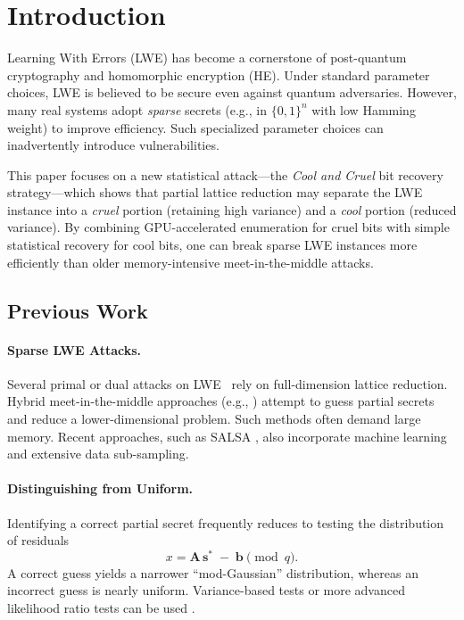 \documentclass[11pt]{article}
\begin{document}
\section{Introduction}
\label{sec:intro}
Learning With Errors (LWE) has become a cornerstone of post-quantum cryptography and homomorphic encryption (HE). Under standard parameter choices, LWE is believed to be secure even against quantum adversaries. However, many real systems adopt \emph{sparse} secrets (e.g., in $\{0,1\}^n$ with low Hamming weight) to improve efficiency. Such specialized parameter choices can inadvertently introduce vulnerabilities.

This paper focuses on a new statistical attack---the \emph{Cool and Cruel} bit recovery strategy---which shows that partial lattice reduction may separate the LWE instance into a \emph{cruel} portion (retaining high variance) and a \emph{cool} portion (reduced variance). By combining GPU-accelerated enumeration for cruel bits with simple statistical recovery for cool bits, one can break sparse LWE instances more efficiently than older memory-intensive meet-in-the-middle attacks.

\subsection{Previous Work}
\label{sec:previous}
\paragraph{Sparse LWE Attacks.}
Several primal or dual attacks on LWE~\cite{regev,bkz2,flatter} rely on full-dimension lattice reduction. Hybrid meet-in-the-middle approaches (e.g., \cite{ref_mitm}) attempt to guess partial secrets and reduce a lower-dimensional problem. Such methods often demand large memory. Recent approaches, such as SALSA \cite{salsa}, also incorporate machine learning and extensive data sub-sampling.

\paragraph{Distinguishing from Uniform.}
Identifying a correct partial secret frequently reduces to testing the distribution of residuals
\[
x = \mathbf{A}\,\mathbf{s}^* \;-\; \mathbf{b} \pmod{q}.
\]
A correct guess yields a narrower ``mod-Gaussian'' distribution, whereas an incorrect guess is nearly uniform. Variance-based tests or more advanced likelihood ratio tests can be used \cite{ref_largen}.
\end{document}
